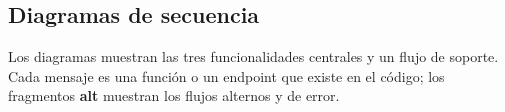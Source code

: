 \subsection{Diagramas de secuencia}\label{sec:secuencia}

Los diagramas muestran las tres funcionalidades centrales y un flujo de soporte. Cada mensaje es una función o un endpoint que existe en el código; los fragmentos \textbf{alt} muestran los flujos alternos y de error.

\newcommand{\vida}[4]{%
  \node[caja, fill=white, font=\scriptsize, text width=2.6cm] (#1) at (#2,0) {#3};
  \draw[gris, dashed] (#1.south) -- (#2,#4);}
\newcommand{\msj}[4]{\draw[flecha] (#1,#3) -- node[above, font=\scriptsize, inner sep=1pt]{#4} (#2,#3);}
\newcommand{\resp}[4]{\draw[flechapunteada] (#1,#3) -- node[above, font=\scriptsize, inner sep=1pt]{#4} (#2,#3);}
\newcommand{\auto}[3]{\draw[flecha] (#1,#2) -- ++(0.45,0) -- ++(0,-0.3) -- node[right, font=\scriptsize, inner sep=1pt, align=left]{#3} ++(-0.45,0);}
\newcommand{\marco}[5]{%
  \draw[gris] (#1,#2) rectangle (#3,#4);
  \node[draw, gris, fill=white, anchor=north west, font=\tiny\bfseries, text=black, inner sep=1.5pt] at (#1,#2) {#5};}


